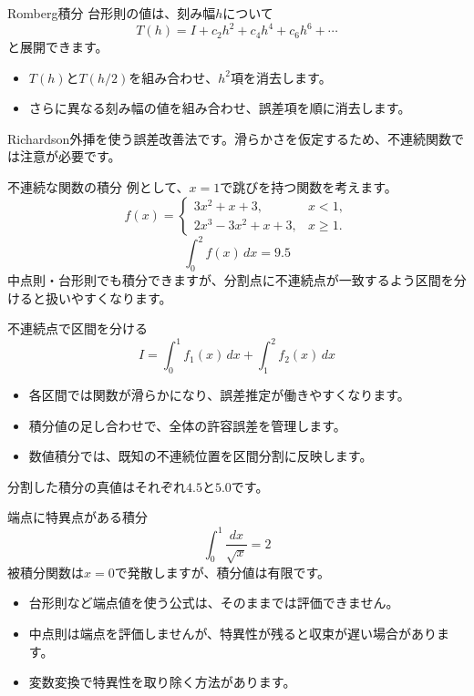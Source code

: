 \documentclass[12pt,aspectratio=43]{beamer}
\begin{document}
\begin{frame}[t]{Romberg積分}
  台形則の値は、刻み幅$h$について
  \[
    T(h)=I+c_2h^2+c_4h^4+c_6h^6+\cdots
  \]
  と展開できます。
  \begin{itemize}
    \item $T(h)$と$T(h/2)$を組み合わせ、$h^2$項を消去します。
    \item さらに異なる刻み幅の値を組み合わせ、誤差項を順に消去します。
  \end{itemize}
  \small Richardson外挿を使う誤差改善法です。滑らかさを仮定するため、不連続関数では注意が必要です。
\end{frame}

\begin{frame}[t]{不連続な関数の積分}
  例として、$x=1$で跳びを持つ関数を考えます。
  \[
    f(x)=\begin{cases}
      3x^2+x+3,&x<1,\\
      2x^3-3x^2+x+3,&x\geq1.
    \end{cases}
  \]
  \[
    \int_0^2 f(x)\,dx=9.5
  \]
  \small 中点則・台形則でも積分できますが、分割点に不連続点が一致するよう区間を分けると扱いやすくなります。
\end{frame}

\begin{frame}[t]{不連続点で区間を分ける}
  \[
    I=\int_0^1 f_1(x)\,dx+\int_1^2 f_2(x)\,dx
  \]
  \begin{itemize}
    \item 各区間では関数が滑らかになり、誤差推定が働きやすくなります。
    \item 積分値の足し合わせで、全体の許容誤差を管理します。
    \item 数値積分では、既知の不連続位置を区間分割に反映します。
  \end{itemize}
  \vfill
  分割した積分の真値はそれぞれ$4.5$と$5.0$です。
\end{frame}

\begin{frame}[t]{端点に特異点がある積分}
  \[
    \int_0^1\frac{dx}{\sqrt{x}}=2
  \]
  被積分関数は$x=0$で発散しますが、積分値は有限です。
  \begin{itemize}
    \item 台形則など端点値を使う公式は、そのままでは評価できません。
    \item 中点則は端点を評価しませんが、特異性が残ると収束が遅い場合があります。
    \item 変数変換で特異性を取り除く方法があります。
  \end{itemize}
\end{frame}
\end{document}

